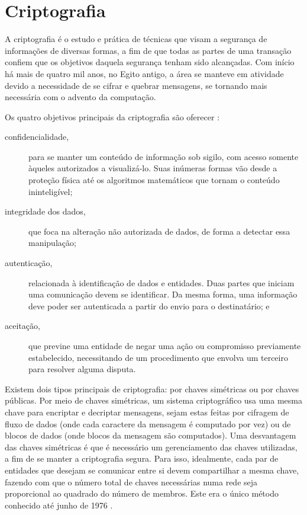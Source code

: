 
\newpage
\section{Criptografia}

A criptografia é o estudo e prática de técnicas que visam a segurança de informações de
diversas formas, a fim de que todas as partes de uma transação confiem que os objetivos
daquela segurança tenham sido alcançadas. Com início há mais de quatro mil anos, no
Egito antigo, a área se manteve em atividade devido a necessidade de se cifrar e quebrar
mensagens, se tornando mais necessária com o advento da computação.

Os quatro objetivos principais da criptografia são oferecer \cite{book:applied-crypto}:

\begin{description}
    \item[confidencialidade,] para se manter um conteúdo de informação sob sigilo,
        com acesso somente àqueles autorizados a visualizá-lo. Suas inúmeras formas vão
        desde a proteção física até os algoritmos matemáticos que tornam o conteúdo
        ininteligível;

    \item[integridade dos dados,] que foca na alteração não autorizada de dados, de
        forma a detectar essa manipulação;

    \item[autenticação,] relacionada à identificação de dados e entidades. Duas partes
        que iniciam uma comunicação devem se identificar. Da mesma forma, uma
        informação deve poder ser autenticada a partir do envio para o destinatário; e

    \item[aceitação,] que previne uma entidade de negar uma ação ou compromisso
        previamente estabelecido, necessitando de um procedimento que envolva um
        terceiro para resolver alguma disputa.
\end{description}

Existem dois tipos principais de criptografia: por chaves simétricas ou por chaves
públicas. Por meio de chaves simétricas, um sistema criptográfico usa uma mesma chave
para encriptar e decriptar mensagens, sejam estas feitas por cifragem de fluxo de dados
(onde cada caractere da mensagem é computado por vez) ou de blocos de dados (onde blocos
da mensagem são computados). Uma desvantagem das chaves simétricas \cite{wiki:crypto} é
que é necessário um gerenciamento das chaves utilizadas, a fim de se manter a
criptografia segura. Para isso, idealmente, cada par de entidades que desejam se
comunicar entre si devem compartilhar a mesma chave, fazendo com que o número total de
chaves necessárias numa rede seja proporcional ao quadrado do número de membros. Este
era o único método conhecido até junho de 1976 \cite{artigo:diffiehellman}.

